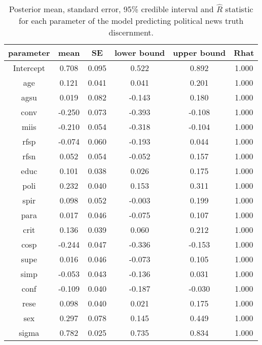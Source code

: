 \documentclass[
  english,
  man,floatsintext]{apa6}
\begin{document}
\begin{table}[H]

\begin{center}
\begin{threeparttable}

\caption{\label{tab:tablerefpol}Posterior mean, standard error, 95\% credible interval and $\hat{R}$
    statistic for each parameter of the model predicting political news truth discernment.}

\small{

\begin{tabular}{cccccc}
\toprule
parameter & \multicolumn{1}{c}{mean} & \multicolumn{1}{c}{SE} & \multicolumn{1}{c}{lower bound} & \multicolumn{1}{c}{upper bound} & \multicolumn{1}{c}{Rhat}\\
\midrule
Intercept & 0.708 & 0.095 & 0.522 & 0.892 & 1.000\\
age & 0.121 & 0.041 & 0.041 & 0.201 & 1.000\\
agsu & 0.019 & 0.082 & -0.143 & 0.180 & 1.000\\
conv & -0.250 & 0.073 & -0.393 & -0.108 & 1.000\\
miis & -0.210 & 0.054 & -0.318 & -0.104 & 1.000\\
rfsp & -0.074 & 0.060 & -0.193 & 0.044 & 1.000\\
rfsn & 0.052 & 0.054 & -0.052 & 0.157 & 1.000\\
educ & 0.101 & 0.038 & 0.026 & 0.175 & 1.000\\
poli & 0.232 & 0.040 & 0.153 & 0.311 & 1.000\\
spir & 0.098 & 0.052 & -0.003 & 0.199 & 1.000\\
para & 0.017 & 0.046 & -0.075 & 0.107 & 1.000\\
crit & 0.136 & 0.039 & 0.060 & 0.212 & 1.000\\
cosp & -0.244 & 0.047 & -0.336 & -0.153 & 1.000\\
supe & 0.016 & 0.046 & -0.073 & 0.105 & 1.000\\
simp & -0.053 & 0.043 & -0.136 & 0.031 & 1.000\\
conf & -0.109 & 0.040 & -0.187 & -0.030 & 1.000\\
rese & 0.098 & 0.040 & 0.021 & 0.175 & 1.000\\
sex & 0.297 & 0.078 & 0.145 & 0.449 & 1.000\\
sigma & 0.782 & 0.025 & 0.735 & 0.834 & 1.000\\
\bottomrule
\end{tabular}

}

\end{threeparttable}
\end{center}

\end{table}
\end{document}
